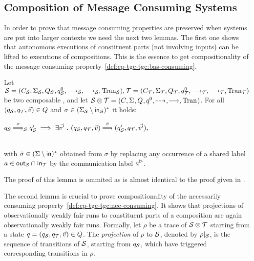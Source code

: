 
\subsection{Composition of Message Consuming Systems}\label{subsec:message-consuming-compos}

In order to prove that message consuming properties are preserved when systems are put into larger
contexts we need the next two lemmas.
The first one shows that autonomous executions of constituent parts (not involving inputs)
can be lifted to executions of compositions.
This is the essence to get compositionality of the message consuming property~\ref{def:cp-tgc-tgc:bas-consuming}.


\begin{lemma}\label{lem:reuse-sequence-tgc}
    Let $\S = \maiotstup{\S}, \T = \maiotstup{\T}$ be two composable \MAIOTSs, and let $\S\compos\T = \maiotstup{}$. For all $(q_\S,q_\T,\vec{v}) \in Q$  and $\sigma \in (\Sigma_\S \setminus \inset_\S)^*$ it holds:
    \\\centerline{$
        q_\S \mustw{\sigma}_\S q'_\S \implies \exists \vec{v'}\ .\ (q_\S,q_\T,\vec{v}) \mustw{\bar\sigma} (q'_\S,q_\T,\vec{v'}),
    $}\\[2mm]
    with $\bar\sigma \in (\Sigma \setminus \inset)^*$ obtained from $\sigma$ by replacing any occurrence of a shared label $a \in \outset_\S \cap \inset_\T$ by the communication label $\outact{a}$.
\end{lemma}
The proof of this lemma is ommited as is almost identical to the proof given in \cite{TechReportVersion}.

The second lemma is crucial to prove compositionality of the
necessarily consuming property~\ref{def:cp-tgc-tgc:nec-consuming}.
It shows that projections of observationally weakly fair runs to constituent parts of a composition are again observationally weakly fair runs.
Formally, let $\rho$ be a trace of $\S\compos\T$ starting from a state $q = (q_\S,q_\T,\vec{v}) \in Q$. The \emph{projection} of $\rho$ to $\S$, denoted by $\rho|_\S$, is the sequence of transitions of $\S$, starting from $q_\S$, which have triggered corresponding transitions in $\rho$.


